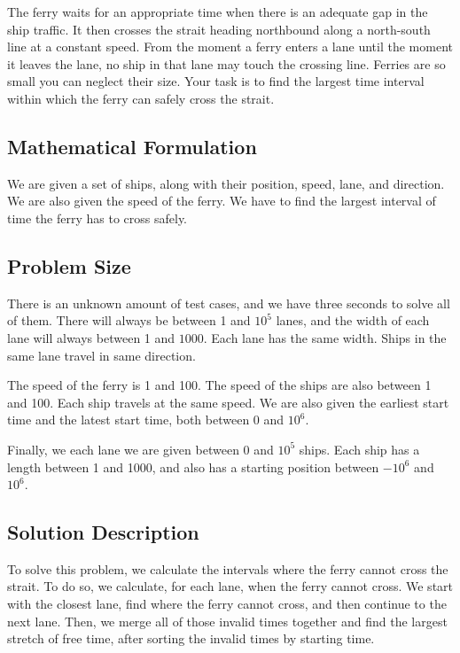 \documentclass[12pt]{article}
\begin{document}
The ferry waits for an appropriate time when there is an adequate
gap in the ship traffic. It then crosses the strait heading northbound
along a north-south line at a constant speed. From the moment a ferry
enters a lane until the moment it leaves the lane, no ship in that lane
may touch the crossing line. Ferries are so small you can neglect their size.
Your task is to find the largest time interval within which the ferry can
safely cross the strait.

\subsection{Mathematical Formulation}

We are given a set of ships, along with their position, speed, lane,
and direction. We are also given the speed of the ferry. We have
to find the largest interval of time the ferry has to cross safely.

\subsection{Problem Size}

There is an unknown amount of test cases, and we have three
seconds to solve all of them. There will always be between 1
and $10^5$ lanes, and the width of each lane will always between
1 and $1000$. Each lane has the same width. Ships in the same
lane travel in same direction.

The speed of the ferry is 1 and 100. The speed of the ships
are also between 1 and 100. Each ship travels at the same speed.
We are also given the earliest start time and the latest start time,
both between 0 and $10^6$.

Finally, we each lane we are given between 0 and $10^5$ ships.
Each ship has a length between 1 and 1000, and also has a starting
position between $-10^6$ and $10^6$.

\subsection{Solution Description}

To solve this problem, we calculate the intervals where the
ferry cannot cross the strait. To do so, we calculate, for each
lane, when the ferry cannot cross. We start with the closest
lane, find where the ferry cannot cross, and then continue
to the next lane. Then, we merge all of those invalid times
together and find the largest stretch of free time, after
sorting the invalid times by starting time.
\end{document}

